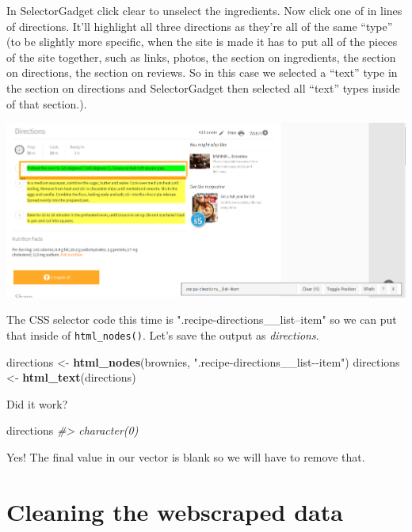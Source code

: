 \documentclass[
  12pt,
]{book}
\newenvironment{Shaded}{\begin{snugshade}}{\end{snugshade}}
\newcommand{\CommentTok}[1]{\textcolor[rgb]{0.37,0.37,0.37}{\textit{#1}}}
\newcommand{\KeywordTok}[1]{\textcolor[rgb]{0.27,0.27,0.27}{\textbf{#1}}}
\newcommand{\NormalTok}[1]{#1}
\newcommand{\StringTok}[1]{\textcolor[rgb]{0.5,0.5,0.5}{#1}}
\begin{document}
In SelectorGadget click clear to unselect the ingredients. Now click one of in lines of directions. It'll highlight all three directions as they're all of the same ``type'' (to be slightly more specific, when the site is made it has to put all of the pieces of the site together, such as links, photos, the section on ingredients, the section on directions, the section on reviews. So in this case we selected a ``text'' type in the section on directions and SelectorGadget then selected all ``text'' types inside of that section.).

\includegraphics{images/brownies_5.PNG}

The CSS selector code this time is ".recipe-directions\_\_list--item" so we can put that inside of \texttt{html\_nodes()}. Let's save the output as \emph{directions}.

\begin{Shaded}
\begin{Highlighting}[]
\NormalTok{directions <{-}}\StringTok{ }\KeywordTok{html\_nodes}\NormalTok{(brownies, }\StringTok{".recipe{-}directions\_\_list{-}{-}item"}\NormalTok{)}
\NormalTok{directions <{-}}\StringTok{ }\KeywordTok{html\_text}\NormalTok{(directions)}
\end{Highlighting}
\end{Shaded}

Did it work?

\begin{Shaded}
\begin{Highlighting}[]
\NormalTok{directions}
\CommentTok{\#> character(0)}
\end{Highlighting}
\end{Shaded}

Yes! The final value in our vector is blank so we will have to remove that.

\hypertarget{cleaning-the-webscraped-data}{%
\section{Cleaning the webscraped data}\label{cleaning-the-webscraped-data}}
\end{document}
